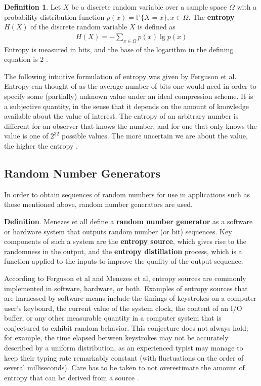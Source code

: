 \documentclass[12pt, titlepage]{report}
\theoremstyle{definition}
\newtheorem{definition}{Definition}
\begin{document}
\begin{definition}
Let $X$ be a discrete random variable over a sample space $\Omega$ with a probability distribution function $p(x)=\mathbb{P}\{X=x\}, x\in\Omega$.  The \textbf{entropy} $H(X)$ of the discrete random variable $X$ is defined as
\begin{gather}\label{eq:entropy}
H(X) = -\sum_{x\in\Omega} p(x) \lg p(x)
\end{gather}
Entropy is measured in bits, and the base of the logarithm in the defining equation is $2$ \cite[p. 12-13]{cover2012elements}.
\end{definition}

The following intuitive formulation of entropy was given by Ferguson et al. Entropy can thought of as the average number of bits one would need in order to specify some (partially) unknown value under an ideal compression scheme. It is a subjective quantity, in the sense that it depends on the amount of knowledge available about the value of interest. The entropy of an arbitrary number is different for an observer that knows the number, and for one that only knows the value is one of $2^32$ possible values. The more uncertain we are about the value, the higher the entropy \cite[p. 137]{ferguson2010cryptography}.



\subsection{Random Number Generators}
In order to obtain sequences of random numbers for use in applications such as those mentioned above, random number generators are used.

\textbf{Definition}. Menezes et all \cite{menezes1996handbook} define a \textbf{random number generator} as a software or hardware system that outputs random number (or bit) sequences. Key components of such a system are the \textbf{entropy source}, which gives rise to the randomness in the output, and the \textbf{entropy distillation} process, which is a function applied to the inputs to improve the quality of the output sequence.

According to Ferguson et al and Menezes et al, entropy sources are commonly implemented in software, hardware, or both. Examples of entropy sources that are harnessed by software means include the timings of keystrokes on a computer user's keyboard, the current value of the system clock, the content of an I/O buffer, or any other measurable quantity in a computer system that is conjectured to exhibit random behavior. This conjecture does not always hold; for example, the time elapsed between keystrokes may not be accurately described by a uniform distribution, as an experienced typist may manage to keep their typing rate remarkably constant (with fluctuations on the order of several milliseconds). Care has to be taken to not overestimate the amount of entropy that can be derived from a source \cite[p. 138-139]{ferguson2010cryptography} \cite[p. 171-172]{menezes1996handbook}.
\end{document}
